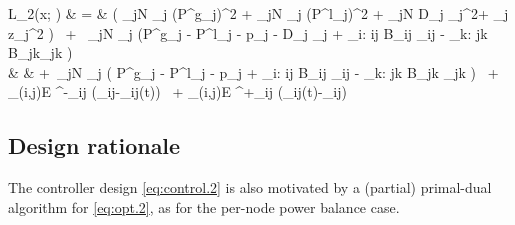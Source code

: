 \setcounter{TempEqCnt}{\value{equation}}
\setcounter{equation}{9}
\begin{figure*}[!t]
	
	
	\bq
	L_2(x; \rho) & \!\!\!\! = \!\!\!\! &  
	 \left( \sum_{j\in N} \alpha_j \left(P^g_j\right)^2 + \sum_{j\in N} \beta_j \left(P^l_j\right)^2
	+ \sum_{j\in N}  D_j \omega_j^2+ \sum_j z_j^2 \right)
	\ + \ \sum_{j\in N} \mu_j \left(P^g_j - P^l_j  - p_j -  D_j \omega_j 
	+ \sum_{i: i\rightarrow j}  B_{ij} \theta_{ij} -  \sum_{k: j\rightarrow k} \! B_{jk}\theta_{jk}  \!\right)
	\nonumber\\ 
	& & 
	+\ \sum_{j\in N} \lambda_j \left(
	P^g_j - P^l_j  - p_j  
	+ \sum_{i: i\rightarrow j} B_{ij} \phi_{ij}
	- \sum_{k: j\rightarrow k} B_{jk} \phi_{jk} \!\right) 
	\ + \sum_{(i,j)\in E} \eta^-_{ij} \left(\underline{\theta}_{ij}-\phi_{ij}(t)\right)
	\ + \sum_{(i,j)\in E} \eta^+_{ij} \left(\phi_{ij}(t)-\overline{\theta}_{ij}\right)
	\label{eq:defL.2}
	\eq
	
	
	\hrulefill
	\vspace*{2pt}
\end{figure*}  
\setcounter{equation}{\value{TempEqCnt}} 

\subsection{Design rationale}
\label{subsec:design2}
The controller design \eqref{eq:control.2} is also motivated by a (partial) primal-dual algorithm for
\eqref{eq:opt.2}, as for the per-node power balance case.   

